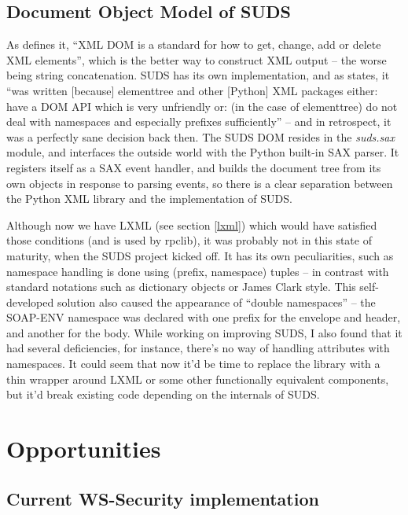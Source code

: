 \subsection{Document Object Model of SUDS}

As \cite{w3schools-domintro} defines it, ``XML DOM is a standard for how to get, change, add or delete XML elements'', which is the better way to construct XML output -- the worse being string concatenation. SUDS has its own implementation, and as \cite{suds-doc} states, it ``was written [because] elementtree and other [Python] XML packages either: have a DOM API which is very unfriendly or: (in the case of elementtree) do not deal with namespaces and especially prefixes sufficiently'' -- and in retrospect, it was a perfectly sane decision back then. The SUDS DOM resides in the \emph{suds.sax} module, and interfaces the outside world with the Python built-in SAX parser. It registers itself as a SAX event handler, and builds the document tree from its own objects in response to parsing events, so there is a clear separation between the Python XML library and the implementation of SUDS.

Although now we have LXML (see section \ref{lxml}) which would have satisfied those conditions (and is used by rpclib), it was probably not in this state of maturity, when the SUDS project kicked off. It has its own peculiarities, such as namespace handling is done using (prefix, namespace) tuples -- in contrast with standard notations such as dictionary objects or James Clark style. This self-developed solution also caused the appearance of ``double namespaces'' -- the SOAP-ENV namespace was declared with one prefix for the envelope and header, and another for the body. While working on improving SUDS, I also found that it had several deficiencies, for instance, there's no way of handling attributes with namespaces. It could seem that now it'd be time to replace the library with a thin wrapper around LXML or some other functionally equivalent components, but it'd break existing code depending on the internals of SUDS.

\section{Opportunities}

\subsection{Current WS-Security implementation}

